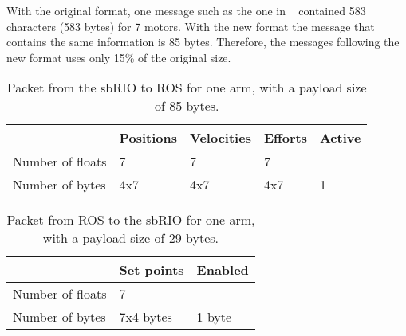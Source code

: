 With the original format, one message such as the one in ~ contained 583 characters (583 bytes) for 7 motors. With the new format the message that contains the same information is 85 bytes. Therefore, the messages following the new format uses only 15\% of the original size.

\begin{table}[H]
\centering
\begin{tabular}{| l | l | l | l | l |}
  \hline			
  				 & Positions & Velocities & Efforts & Active\\ \hline
Number of floats & 7 		 & 7 		  & 7 		& 		\\ \hline
Number of bytes  & 4x7 		 & 4x7 		  & 4x7 	& 1		\\
\hline  
\end{tabular}
\caption{Packet from the sbRIO to ROS for one arm, with a payload size of 85 bytes.}
\label{fig:received_packet}
\end{table}

\begin{table}[H]
\centering
\begin{tabular}{| l | l | l |}
\hline			
					& Set points	 & Enabled\\ \hline
Number of floats	& 7				 &		  \\ \hline
Number of bytes		& 7x4 bytes		 & 1 byte \\
\hline  
\end{tabular}
\caption{Packet from ROS to the sbRIO for one arm, with a payload size of 29 bytes.}
\label{fig:sent_packet}
\end{table}







